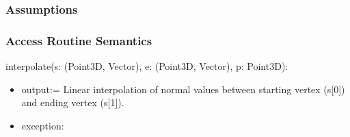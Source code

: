 \documentclass[12pt, titlepage]{article}
\begin{document}
\subsubsection{Assumptions}

\subsubsection{Access Routine Semantics}
\noindent interpolate(s: (Point3D, Vector), e: (Point3D, Vector), p: Point3D):
\begin{itemize}
	\item output:= Linear interpolation of normal values between starting 
	vertex (s[0]) and ending vertex (s[1]).\\
	\item exception: \\
\end{itemize}
\end{document}
